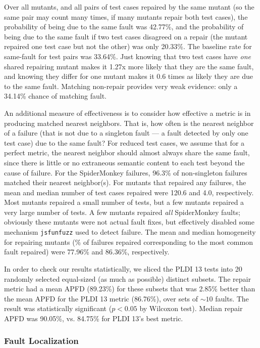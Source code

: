 Over all mutants, and all pairs of test cases repaired by the same mutant (so the same pair may count many times, if many mutants repair both test cases), the probability of being due to the same fault was 42.77\%, and the probability of being due to the same fault if two test cases disagreed on a repair (the mutant repaired one test case but not the other) was only 20.33\%.  The baseline rate for same-fault for test pairs was 33.64\%.  Just knowing that two test cases have \emph{one} shared repairing mutant makes it 1.27x more likely that they are the same fault, and knowing they differ for one mutant makes it 0.6 times as likely they are due to the same fault.  Matching non-repair provides very weak evidence:  only a 34.14\% chance of matching fault.

An additional measure of effectiveness is to consider how effective a metric is in producing matched nearest neighbors.  That is, how often is the nearest neighbor of a failure (that is not due to a singleton fault --- a fault detected by only one test case) due to the same fault?  For reduced \cite{DD,PLDI13,
CReduce} test cases, we assume that for a perfect metric, the nearest neighbor should almost always share the same fault, since there is little or no extraneous semantic content to each test beyond the cause of failure.  For the SpiderMonkey failures, 96.3\% of non-singleton failures matched their nearest neighbor(s).  For mutants that repaired any failures, the mean and median number of test cases repaired were 120.6 and 4.0, respectively.  Most mutants repaired a small number of tests, but a few mutants repaired a very large number of tests.  A few mutants repaired \emph{all} SpiderMonkey faults; obviously these mutants were not actual fault fixes, but effectively disabled some mechanism {\tt jsfunfuzz} used to detect failure. The mean and median homogeneity for repairing mutants (\% of failures repaired corresponding to the most common fault repaired) were 77.96\% and 86.36\%, respectively.  

In order to check our results statistically, we sliced the PLDI 13 tests into 20 randomly selected equal-sized (as much as possible) distinct subsets.  The repair metric had a mean APFD (89.23\%) for these subsets that was 2.85\% better than the mean APFD for the PLDI 13 metric (86.76\%), over sets of $\sim 10$ faults. The result was statistically significant ($p < 0.05$ by Wilcoxon test).   Median repair APFD was 90.05\%, vs. 84.75\% for PLDI 13's best metric.


\subsubsection{Fault Localization}

